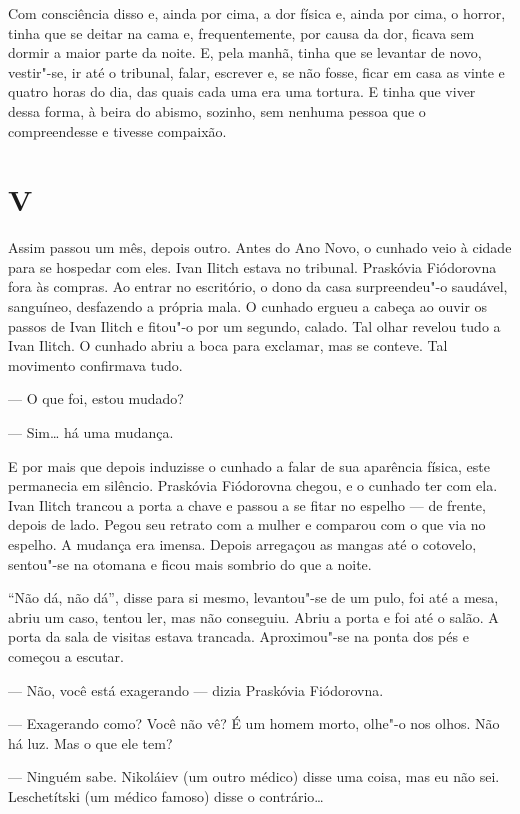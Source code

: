 Com consciência disso e, ainda por cima, a dor física e, ainda por cima,
o horror, tinha que se deitar na cama e, frequentemente, por causa da
dor, ficava sem dormir a maior parte da noite. E, pela manhã, tinha que
se levantar de novo, vestir"-se, ir até o tribunal, falar, escrever e, se
não fosse, ficar em casa as vinte e quatro horas do dia, das quais cada
uma era uma tortura. E tinha que viver dessa forma, à beira do abismo,
sozinho, sem nenhuma pessoa que o compreendesse e tivesse compaixão.

\section{V}

Assim passou um mês, depois outro. Antes do Ano Novo, o cunhado veio à
cidade para se hospedar com eles. Ivan Ilitch estava no tribunal.
Praskóvia Fiódorovna fora às compras. Ao entrar no escritório, o dono da
casa surpreendeu"-o saudável, sanguíneo, desfazendo a própria mala. O
cunhado ergueu a cabeça ao ouvir os passos de Ivan Ilitch e fitou"-o por
um segundo, calado. Tal olhar revelou tudo a Ivan Ilitch. O cunhado
abriu a boca para exclamar, mas se conteve. Tal movimento confirmava
tudo.

--- O que foi, estou mudado?

--- Sim\ldots{} há uma mudança.

E por mais que depois induzisse o cunhado a falar de sua aparência
física, este permanecia em silêncio. Praskóvia Fiódorovna chegou, e o
cunhado ter com ela. Ivan Ilitch trancou a porta a chave e passou a se
fitar no espelho --- de frente, depois de lado. Pegou seu retrato com a
mulher e comparou com o que via no espelho. A mudança era imensa. Depois
arregaçou as mangas até o cotovelo, sentou"-se na otomana e ficou mais
sombrio do que a noite.

``Não dá, não dá'', disse para si mesmo, levantou"-se de um pulo, foi até
a mesa, abriu um caso, tentou ler, mas não conseguiu. Abriu a porta e
foi até o salão. A porta da sala de visitas estava trancada.
Aproximou"-se na ponta dos pés e começou a escutar.

--- Não, você está exagerando --- dizia Praskóvia Fiódorovna.

--- Exagerando como? Você não vê? É um homem morto, olhe"-o nos olhos. Não
há luz. Mas o que ele tem?

--- Ninguém sabe. Nikoláiev (um outro médico) disse uma coisa, mas eu não
sei. Leschetítski (um médico famoso) disse o contrário\ldots{}


